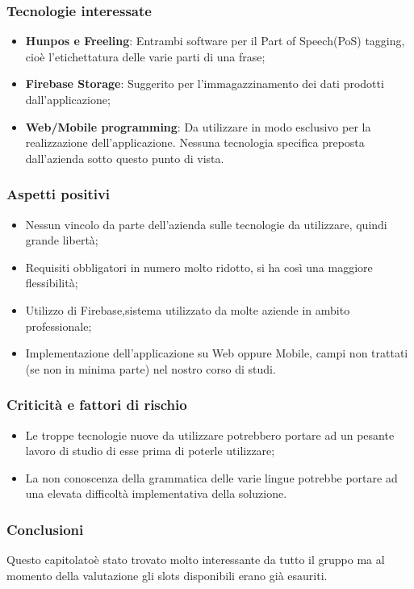 \subsubsection{Tecnologie interessate}
\begin{itemize}
	\item \textbf{Hunpos e Freeling}: Entrambi software per il Part of Speech(PoS) tagging, cioè l'etichettatura delle varie parti di una frase;
	\item \textbf{Firebase Storage}: Suggerito per l'immagazzinamento dei dati prodotti dall'applicazione;
	\item \textbf{Web/Mobile programming}: Da utilizzare in modo esclusivo per la realizzazione dell'applicazione. Nessuna tecnologia specifica preposta dall'azienda sotto questo punto di vista.
\end{itemize}
\subsubsection{Aspetti positivi}
\begin{itemize}
	\item Nessun vincolo da parte dell'azienda sulle tecnologie da utilizzare, quindi grande libertà;
	\item Requisiti obbligatori in numero molto ridotto, si ha così una maggiore flessibilità;
	\item Utilizzo di Firebase,sistema utilizzato da molte aziende in ambito professionale;
	\item Implementazione dell'applicazione su Web oppure Mobile, campi non trattati (se non in minima parte) nel nostro corso di studi. 
\end{itemize}
\subsubsection{Criticità e fattori di rischio}
\begin{itemize}
\item Le troppe tecnologie nuove da utilizzare potrebbero portare ad un pesante lavoro di studio di esse prima di poterle utilizzare;
\item La non conoscenza della grammatica delle varie lingue potrebbe portare ad una elevata difficoltà implementativa della soluzione.
\end{itemize}
\subsubsection{Conclusioni}
Questo capitolato\glosp è stato trovato molto interessante da tutto il gruppo ma al momento della valutazione gli slots disponibili erano già esauriti.